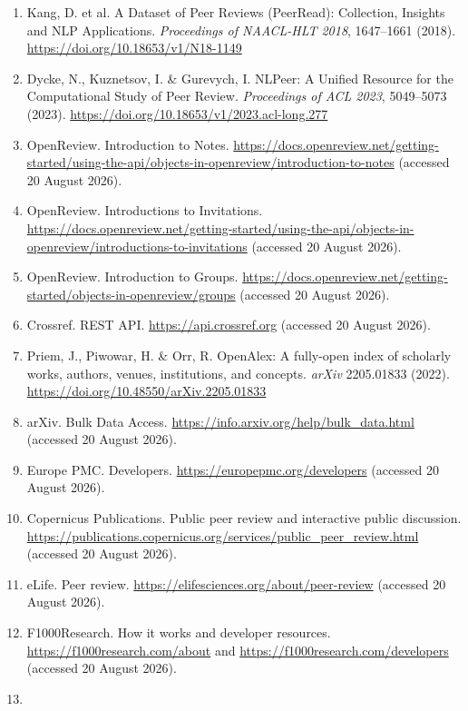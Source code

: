 \documentclass[
  10pt,
]{article}
\providecommand{\tightlist}{%
  \setlength{\itemsep}{0pt}\setlength{\parskip}{0pt}}
\begin{document}
{\scriptsize
\begin{enumerate}
\def\labelenumi{\arabic{enumi}.}
\tightlist
\item
  Kang, D. et al. A Dataset of Peer Reviews (PeerRead): Collection,
  Insights and NLP Applications. \emph{Proceedings of NAACL-HLT 2018},
  1647--1661 (2018). \url{https://doi.org/10.18653/v1/N18-1149}
\item
  Dycke, N., Kuznetsov, I. \& Gurevych, I. NLPeer: A Unified Resource
  for the Computational Study of Peer Review. \emph{Proceedings of ACL
  2023}, 5049--5073 (2023).
  \url{https://doi.org/10.18653/v1/2023.acl-long.277}
\item
  OpenReview. Introduction to Notes.
  \url{https://docs.openreview.net/getting-started/using-the-api/objects-in-openreview/introduction-to-notes}
  (accessed 20 August 2026).
\item
  OpenReview. Introductions to Invitations.
  \url{https://docs.openreview.net/getting-started/using-the-api/objects-in-openreview/introductions-to-invitations}
  (accessed 20 August 2026).
\item
  OpenReview. Introduction to Groups.
  \url{https://docs.openreview.net/getting-started/objects-in-openreview/groups}
  (accessed 20 August 2026).
\item
  Crossref. REST API. \url{https://api.crossref.org} (accessed 20 August
  2026).
\item
  Priem, J., Piwowar, H. \& Orr, R. OpenAlex: A fully-open index of
  scholarly works, authors, venues, institutions, and concepts.
  \emph{arXiv} 2205.01833 (2022).
  \url{https://doi.org/10.48550/arXiv.2205.01833}
\item
  arXiv. Bulk Data Access.
  \url{https://info.arxiv.org/help/bulk_data.html} (accessed 20 August
  2026).
\item
  Europe PMC. Developers. \url{https://europepmc.org/developers}
  (accessed 20 August 2026).
\item
  Copernicus Publications. Public peer review and interactive public
  discussion.
  \url{https://publications.copernicus.org/services/public_peer_review.html}
  (accessed 20 August 2026).
\item
  eLife. Peer review. \url{https://elifesciences.org/about/peer-review}
  (accessed 20 August 2026).
\item
  F1000Research. How it works and developer resources.
  \url{https://f1000research.com/about} and
  \url{https://f1000research.com/developers} (accessed 20 August 2026).
\item

\end{enumerate}}
\end{document}

